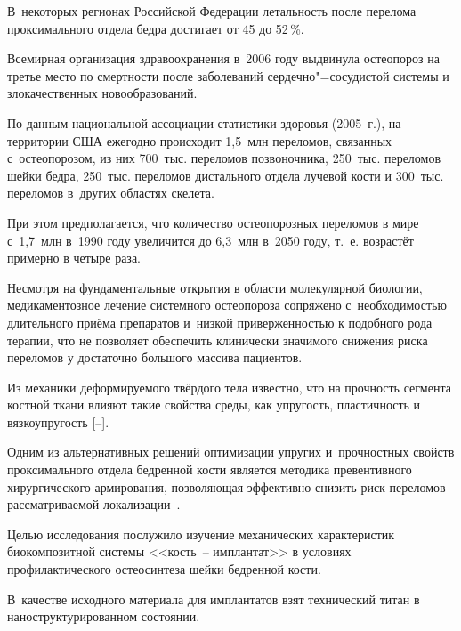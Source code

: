 В~некоторых регионах Российской Федерации летальность после перелома проксимального отдела бедра достигает от 45 до 52\,\%.   



Всемирная организация здравоохранения в~2006 году выдвинула остеопороз на третье место по смертности после заболеваний сердечно"=сосудистой системы и злокачественных новообразований. 

По данным национальной ассоциации статистики здоровья (2005~г.), на территории США ежегодно происходит 1,5~млн переломов, связанных с~остеопорозом, из них 700~тыс. переломов позвоночника, 250~тыс. переломов шейки бедра, 250~тыс. переломов дистального отдела лучевой кости и 300~тыс. переломов в~других областях скелета. 

При этом предполагается, что количество остеопорозных переломов в мире с~1,7~млн в~1990 году увеличится до 6,3~млн в~2050 году, т.~е. возрастёт примерно в четыре раза. 



Несмотря на фундаментальные открытия в области молекулярной биологии, медикаментозное лечение системного остеопороза сопряжено с~необходимостью длительного приёма препаратов и~низкой приверженностью к подобного рода терапии, что не позволяет обеспечить клинически значимого снижения риска переломов у достаточно большого массива пациентов. 

Из механики деформируемого твёрдого тела известно, что на прочность сегмента костной ткани влияют такие свойства среды, как упругость, пластичность и вязкоупругость [--]. 

Одним из альтернативных решений оптимизации упругих и~прочностных свойств проксимального отдела бедренной кости является методика превентивного хирургического армирования, позволяющая эффективно снизить риск переломов рассматриваемой локализации~\cite{nekh:b10}.    



Целью исследования послужило изучение механических характеристик биокомпозитной системы <<кость~-- имплантат>> в условиях профилактического остеосинтеза шейки бедренной кости.



\smallskip




В~качестве исходного материала для имплантатов взят технический титан в наноструктурированном состоянии.

